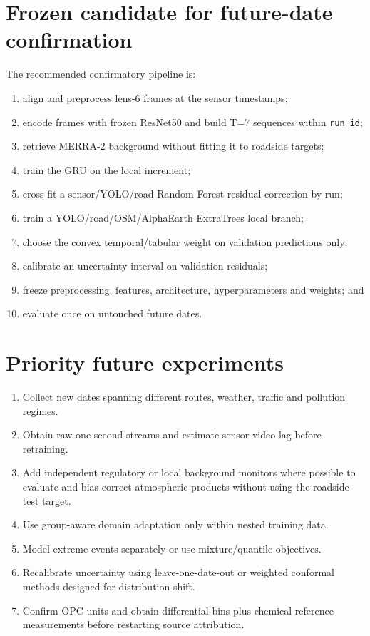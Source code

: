 \documentclass[11pt,a4paper,oneside]{report}
\begin{document}
\section{Frozen candidate for future-date confirmation}
The recommended confirmatory pipeline is:
\begin{enumerate}
  \item align and preprocess lens-6 frames at the sensor timestamps;
  \item encode frames with frozen ResNet50 and build T=7 sequences within
        \texttt{run\_id};
  \item retrieve MERRA-2 background without fitting it to roadside targets;
  \item train the GRU on the local increment;
  \item cross-fit a sensor/YOLO/road Random Forest residual correction by run;
  \item train a YOLO/road/OSM/AlphaEarth ExtraTrees local branch;
  \item choose the convex temporal/tabular weight on validation predictions
        only;
  \item calibrate an uncertainty interval on validation residuals;
  \item freeze preprocessing, features, architecture, hyperparameters and
        weights; and
  \item evaluate once on untouched future dates.
\end{enumerate}

\section{Priority future experiments}
\begin{enumerate}
  \item Collect new dates spanning different routes, weather, traffic and
        pollution regimes.
  \item Obtain raw one-second streams and estimate sensor-video lag before
        retraining.
  \item Add independent regulatory or local background monitors where possible
        to evaluate and bias-correct atmospheric products without using the
        roadside test target.
  \item Use group-aware domain adaptation only within nested training data.
  \item Model extreme events separately or use mixture/quantile objectives.
  \item Recalibrate uncertainty using leave-one-date-out or weighted conformal
        methods designed for distribution shift.
  \item Confirm OPC units and obtain differential bins plus chemical reference
        measurements before restarting source attribution.
\end{enumerate}
\end{document}
